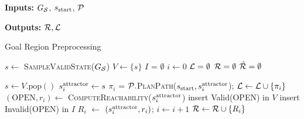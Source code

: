 \documentclass[a4paper,10pt]{article}
\begin{document}
\begin{algorithm}[t]
\footnotesize
\hspace*{\algorithmicindent} \textbf{Inputs:} $G_\mathcal{S}$, $s_{\textrm{start}}$, $\mathcal{P}$

\hspace*{\algorithmicindent} \textbf{Outputs:} 
$\mathcal{R}, \mathcal{L}$

\caption{Goal Region Preprocessing}\label{alg:1}
\begin{algorithmic}[1]
  \State $s \leftarrow$\textsc{ SampleValidState}($G_\mathcal{S}$)
  \State $V \leftarrow \{ s \}$    \label{alg:1:v}
  \State $I$ = $\emptyset$    \label{alg:1:i}
  \State $ i \leftarrow 0$
       \hspace{2mm} 
       $\mathcal{L} = \emptyset$
       \hspace{2mm} 
       $\mathcal{R} = \emptyset$
       \hspace{2mm} 
       $\hat{\mathcal{R}} = \emptyset$
       
  \vspace{2mm}
          \State $s \leftarrow V.\text{pop}()$ \label{alg:1:pop}
              \label{alg:1:discard}
        \State $s^{\text{attractor}}_i \leftarrow s$               
        \label{alg:1:attract} 
                \State $\pi_i$ = $\mathcal{P}.$\textsc{PlanPath}($s_{\textrm{start}}, s^{\text{attractor}}_i$); \label{alg:1:pp}
                \hspace{2mm }
                $\mathcal{L} \leftarrow \mathcal{L} \cup \{ \pi_i \}$  \label{alg:1:path}
                \State $(\text{OPEN}, r_i) \leftarrow$ \textsc{ComputeReachability}($s^{\text{attractor}}_i$) \label{alg:1:cr}
                \State insert Valid(OPEN) in $V$  \label{alg:1:insert_v}
                \State insert Invalid(OPEN) in $I$   \label{alg:1:insert_i}
                \State $R_i$ $\leftarrow$ $(s^{\text{attractor}}_i, r_i)$; 
                \hspace{2mm} $ i \leftarrow i+1$        \hspace{2mm }
                $\mathcal{R} \leftarrow \mathcal{R} \cup \{ R_i \}$
                            \EndIf
        \EndWhile


\end{algorithmic}
\end{algorithm}
\end{document}
